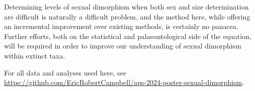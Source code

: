 \documentclass[letterpaper]{article}
\begin{document}
Determining levels of sexual dimorphism when both sex and size determination are difficult is naturally a difficult problem, and the method here, while offering an incremental improvement over existing methods, is certainly no panacea. Further efforts, both on the statistical and palaeontological side of the equation, will be required in order to improve our understanding of sexual dimorphism within extinct taxa.

For all data and analyses used here, see \url{https://github.com/EricRobertCampbell/aps-2024-poster-sexual-dimorphism}.

\printbibliography[title=Bibliography]
\end{document}
